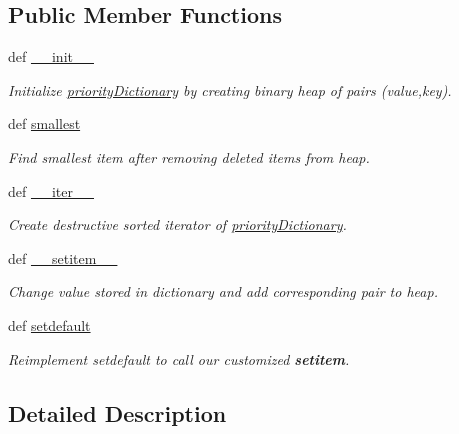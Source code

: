 \subsection*{Public Member Functions}
\begin{DoxyCompactItemize}
\item 
def \hyperlink{classpriodict_1_1priorityDictionary_a0b614c3f902b4ca714c9a8173c4ec3e3}{\-\_\-\-\_\-init\-\_\-\-\_\-}
\begin{DoxyCompactList}\small\item\em Initialize \hyperlink{classpriodict_1_1priorityDictionary}{priority\-Dictionary} by creating binary heap of pairs (value,key). \end{DoxyCompactList}\item 
def \hyperlink{classpriodict_1_1priorityDictionary_addbfef62eca26714c932482d2df9f14a}{smallest}
\begin{DoxyCompactList}\small\item\em Find smallest item after removing deleted items from heap. \end{DoxyCompactList}\item 
def \hyperlink{classpriodict_1_1priorityDictionary_ae2386d1d220c9be0c3193adf425423dd}{\-\_\-\-\_\-iter\-\_\-\-\_\-}
\begin{DoxyCompactList}\small\item\em Create destructive sorted iterator of \hyperlink{classpriodict_1_1priorityDictionary}{priority\-Dictionary}. \end{DoxyCompactList}\item 
def \hyperlink{classpriodict_1_1priorityDictionary_a862dc448352bd602da86d957a4752167}{\-\_\-\-\_\-setitem\-\_\-\-\_\-}
\begin{DoxyCompactList}\small\item\em Change value stored in dictionary and add corresponding pair to heap. \end{DoxyCompactList}\item 
def \hyperlink{classpriodict_1_1priorityDictionary_aaba46b716d256d1d0b79ec44a2195c19}{setdefault}
\begin{DoxyCompactList}\small\item\em Reimplement setdefault to call our customized {\bfseries setitem}. \end{DoxyCompactList}\end{DoxyCompactItemize}


\subsection{Detailed Description}


